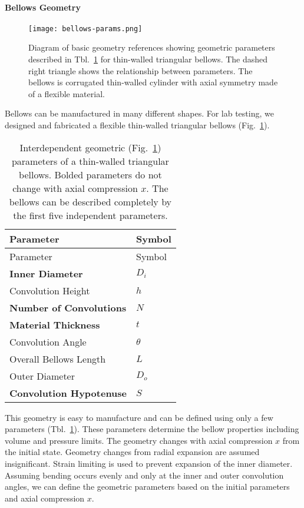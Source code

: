 \hypertarget{ch1:bellows-geometry}{%
\paragraph{Bellows Geometry}\label{ch1:bellows-geometry}}

\begin{figure}
\hypertarget{ch1:fig:bellows-params}{%
\centering
\texttt{[image: bellows-params.png]}
\caption{Diagram of basic geometry references showing geometric
parameters described in Tbl.~\ref{ch1:tbl:bellows-params} for thin-walled
triangular bellows. The dashed right triangle shows the relationship
between parameters. The bellows is corrugated thin-walled cylinder with
axial symmetry made of a flexible material.}\label{ch1:fig:bellows-params}
}
\end{figure}

Bellows can be manufactured in many different shapes. For lab testing,
we designed and fabricated a flexible thin-walled triangular bellows
(Fig.~\ref{ch1:fig:bellows-params}).


\hypertarget{ch1:tbl:bellows-params}{}
\begin{longtable}[]{@{}ll@{}}
\caption{\label{ch1:tbl:bellows-params}Interdependent geometric
(Fig.~\ref{ch1:fig:bellows-params}) parameters of a thin-walled triangular
bellows. Bolded parameters do not change with axial compression \(x\).
The bellows can be described completely by the first five independent
parameters.}\tabularnewline
\toprule\noalign{}
Parameter & Symbol \\
\midrule\noalign{}
\endfirsthead
\toprule\noalign{}
Parameter & Symbol \\
\midrule\noalign{}
\endhead
\bottomrule\noalign{}
\endlastfoot
\textbf{Inner Diameter} & \(D_i\) \\
Convolution Height & \(h\) \\
\textbf{Number of Convolutions} & \(N\) \\
\textbf{Material Thickness} & \(t\) \\
Convolution Angle & \(\theta\) \\
Overall Bellows Length & \(L\) \\
Outer Diameter & \(D_o\) \\
\textbf{Convolution Hypotenuse} & \(S\) \\
\end{longtable}

This geometry is easy to manufacture and can be defined using only a few
parameters (Tbl.~\ref{ch1:tbl:bellows-params}). These parameters determine
the bellow properties including volume and pressure limits. The geometry
changes with axial compression \(x\) from the initial state. Geometry
changes from radial expansion are assumed insignificant. Strain limiting
is used to prevent expansion of the inner diameter. Assuming bending
occurs evenly and only at the inner and outer convolution angles, we can
define the geometric parameters based on the initial parameters and
axial compression \(x\).

